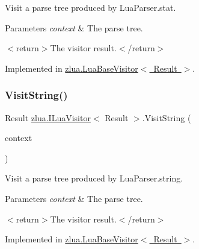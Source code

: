 Visit a parse tree produced by Lua\+Parser.\+stat. 


\begin{DoxyParams}{Parameters}
{\em context} & The parse tree.\\
\hline
\end{DoxyParams}
$<$return$>$The visitor result.$<$/return$>$ 

Implemented in \mbox{\hyperlink{classzlua_1_1_lua_base_visitor_a64a5b6fe7b4450d97a48968ddbc02a23}{zlua.\+Lua\+Base\+Visitor$<$ Result $>$}}.

\mbox{\label{interfacezlua_1_1_i_lua_visitor_a7a2526a8d4201c1a018bf3b1e11a06c1}} 
\subsubsection{\texorpdfstring{Visit\+String()}{VisitString()}}
{\footnotesize\ttfamily Result \mbox{\hyperlink{interfacezlua_1_1_i_lua_visitor}{zlua.\+I\+Lua\+Visitor}}$<$ Result $>$.Visit\+String (\begin{DoxyParamCaption}\item[{\mbox{[}\+Not\+Null\mbox{]} \mbox{\hyperlink{classzlua_1_1_lua_parser_1_1_string_context}{Lua\+Parser.\+String\+Context}}}]{context }\end{DoxyParamCaption})}



Visit a parse tree produced by Lua\+Parser.\+string. 


\begin{DoxyParams}{Parameters}
{\em context} & The parse tree.\\
\hline
\end{DoxyParams}
$<$return$>$The visitor result.$<$/return$>$ 

Implemented in \mbox{\hyperlink{classzlua_1_1_lua_base_visitor_a124ac677211caa574c4c2695e5428538}{zlua.\+Lua\+Base\+Visitor$<$ Result $>$}}.

\mbox{\label{interfacezlua_1_1_i_lua_visitor_a03f9e5eb30ac270a1efa99bfe98e2f96}} 
